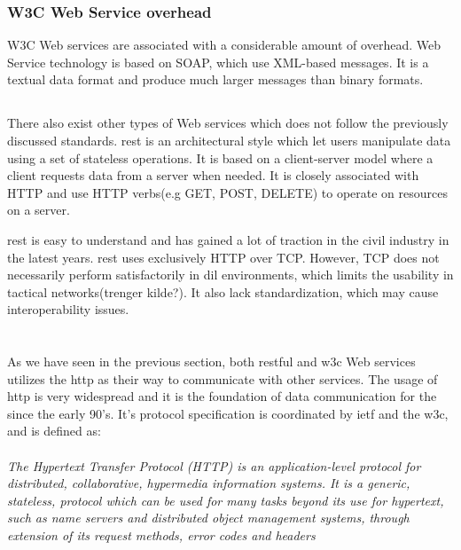 \subsubsection{W3C Web Service overhead}

W3C Web services are associated with a considerable amount of overhead. Web
Service technology is based on SOAP, which use XML-based messages. It is a
textual data format and produce much larger messages than binary formats.


\subsection{}
\label{rest}

There also exist other types of Web services which does not follow the
previously discussed standards. \gls{rest} is an architectural style which let
users manipulate data using a set of stateless operations. It is based on a
client-server model where a client requests data from a server when needed. It
is closely associated with HTTP and use HTTP verbs(e.g GET, POST,
DELETE) to operate on resources on a server.

 \gls{rest} is easy to understand and has gained a lot of traction in the
civil  industry in the latest years. \gls{rest} uses exclusively HTTP over
TCP.  However, TCP does not necessarily perform satisfactorily in \gls{dil}
environments, which limits the usability in tactical networks(trenger kilde?).
It also lack standardization, which may cause interoperability issues.



\section{}

As we have seen in the previous section, both restful and w3c Web services
utilizes the \gls{http} as their way to communicate with other services. The
usage of \gls{http} is very widespread and it is the foundation of data
communication for the  since the early 90's. It's protocol
specification is coordinated by \gls{ietf} and the \gls{w3c}, and is defined
as\cite{rfc-2616}:

\paragraph{}
\textit{
    The Hypertext Transfer Protocol (HTTP) is an application-level
    protocol for distributed, collaborative, hypermedia information
    systems. It is a generic, stateless, protocol which can be used for
    many tasks beyond its use for hypertext, such as name servers and
    distributed object management systems, through extension of its
    request methods, error codes and headers
}

